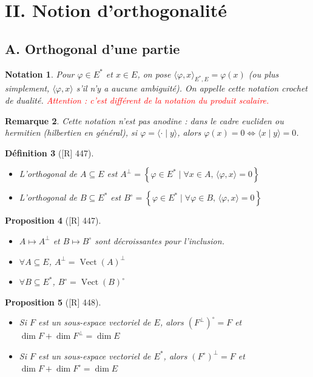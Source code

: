 \documentclass[10pt, a4paper, parskip=full, twoside, twocolumn]{report}
\newtheorem{definition}{Définition}
\newtheorem{proposition}[definition]{Proposition}
\newtheorem{remark}[definition]{Remarque}
\newtheorem{notation}[definition]{Notation}
\DeclareMathOperator{\Vect}{Vect}
\begin{document}
\section*{II. Notion d'orthogonalité}
\subsection*{A. Orthogonal d'une partie}

\begin{notation}
	Pour $\varphi\in E^*$ et $x\in E$, on pose $\langle\varphi, x\rangle_{E^*, E} = \varphi(x)$ (ou plus simplement, $\langle\varphi,x\rangle$ s'il n'y a aucune ambiguité).
	On appelle cette notation \emph{crochet de dualité}.
	\textcolor{red}{Attention : c'est différent de la notation du produit scalaire.}
\end{notation}

\begin{remark}
	Cette notation n'est pas anodine : dans le cadre eucliden ou hermitien (hilbertien en général), si $\varphi = \langle \cdot\mid y\rangle$, alors $\varphi(x)=0\iff \langle x\mid y\rangle=0$.
\end{remark}

\begin{definition}[\textnormal{[R] 447}]
	\begin{itemize}
		\item L'\emph{orthogonal de $A\subseteq E$} est $A^{\perp} = \left\{\varphi\in E^*\mid \forall x\in A,\, \langle \varphi,x\rangle = 0\right\}$
		\item L'\emph{orthogonal de $B\subseteq E^*$} est $B^{\circ} = \left\{\varphi\in E^*\mid \forall \varphi\in B,\, \langle \varphi,x\rangle = 0\right\}$
	\end{itemize}
\end{definition}

\begin{proposition}[\textnormal{[R] 447}]
	\begin{itemize}
		\item $A\mapsto A^{\perp}$ et $B\mapsto B^{\circ}$ sont décroissantes pour l'inclusion.
		\item $\forall A\subseteq E$, $A^{\perp} = \Vect(A)^{\perp}$
		\item $\forall B\subseteq E^*$, $B^{\circ} = \Vect(B)^{\circ}$
	\end{itemize}
\end{proposition}

\begin{proposition}[\textnormal{[R] 448}]
	\begin{itemize}
		\item Si $F$ est un sous-espace vectoriel de $E$, alors $\left(F^{\perp}\right)^{\circ} = F$ et $\dim F + \dim F^{\perp} = \dim E$
		\item Si $F$ est un sous-espace vectoriel de $E^*$, alors $\left(F^{\circ}\right)^{\perp} = F$ et $\dim F + \dim F^{\circ} = \dim E$
	\end{itemize}
\end{proposition}
\end{document}
